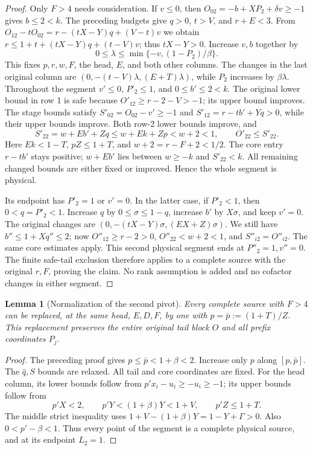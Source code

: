 \documentclass[11pt,reqno]{amsart}
\newtheorem{lemma}[theorem]{Lemma}
\theoremstyle{definition}
\theoremstyle{remark}
\begin{document}
\begin{proof}
Only \(F>4\) needs consideration. If \(v\le0\), then
\(O_{02}=-b+XP_2+\delta v\ge-1\) gives \(b\le2<k\).
The preceding budgets give \(q>0\), \(t>V\), and
\(r+E<3\). From
\(O_{12}-tO_{02}=r-(tX-Y)q+(V-t)v\) we obtain
\(r\le1+t+(tX-Y)q+(t-V)v\); thus \(tX-Y>0\).
Increase \(v,b\) together by
\[
 0\le\lambda\le\min\{-v,(1-P_2)/\beta\}.
\]
This fixes \(p,r,w,F\), the head, \(E\), and both other columns.
The changes in the last original column are
\((0,-(t-V)\lambda,(E+T)\lambda)\), while
\(P_2\) increases by \(\beta\lambda\).
Throughout the segment \(v'\le0\), \(P'_2\le1\), and
\(0\le b'\le2<k\).
The original lower bound in row 1 is safe because
\(O'_{12}\ge r-2-V>-1\); its upper bound improves.
The stage bounds satisfy
\(S'_{02}=O_{02}-v'\ge-1\) and
\(S'_{12}=r-tb'+Yq>0\), while their upper bounds improve.
Both row-2 lower bounds improve, and
\[
 S'_{22}=w+Eb'+Zq\le w+Ek+Zp<w+2<1,
 \qquad O'_{22}\le S'_{22}.
\]
Here \(Ek<1-T\), \(pZ\le1+T\), and
\(w+2=r-F+2<1/2\). The core entry \(r-tb'\) stays positive;
\(w+Eb'\) lies between \(w\ge-k\) and \(S'_{22}<k\).
All remaining changed bounds are either fixed or improved. Hence the
whole segment is physical.

Its endpoint has \(P'_2=1\) or \(v'=0\). In the latter case,
if \(P'_2<1\), then \(0<q=P'_2<1\). Increase \(q\) by
\(0\le\sigma\le1-q\), increase \(b'\) by \(X\sigma\),
and keep \(v'=0\). The original changes are
\((0,-(tX-Y)\sigma,(EX+Z)\sigma)\).
We still have \(b''\le1+Xq''\le2\); now
\(O''_{12}\ge r-2>0\), \(O''_{22}<w+2<1\), and
\(S''_{i2}=O''_{i2}\). The same core estimates apply.
This second physical segment ends at \(P''_2=1,v''=0\).
The finite safe-tail exclusion therefore applies to a complete source
with the original \(r,F\), proving the claim. No rank assumption is
added and no cofactor changes in either segment.
\end{proof}

\begin{lemma}[Normalization of the second pivot]
\label{s3:cc-p-normalization}
Every complete source with \(F>4\) can be replaced, at the same
head, \(E,D,F\), by one with
\(p=\bar p:=(1+T)/Z\). This replacement preserves the entire
original tail block \(O\) and all prefix coordinates \(P_j\).
\end{lemma}
\begin{proof}
The preceding proof gives \(p\le\bar p<1+\beta<2\).
Increase only \(p\) along \([p,\bar p]\). The \(\widehat q,S\)
bounds are relaxed. All tail and core coordinates are fixed.
For the head column, its lower bounds follow from
\(p'x_i-u_i\ge-u_i\ge-1\); its upper bounds follow from
\[
 p'X<2,
 \qquad p'Y<(1+\beta)Y<1+V,
 \qquad p'Z\le1+T.
\]
The middle strict inequality uses
\(1+V-(1+\beta)Y=1-Y+\Gamma>0\).
Also \(0<p'-\beta<1\). Thus every point of the segment is a
complete physical source, and at its endpoint \(L_2=1\).
\end{proof}
\end{document}
